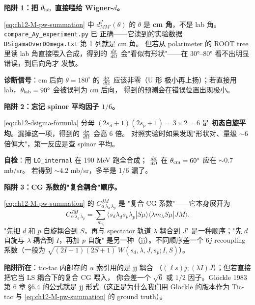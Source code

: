 \begin{pitfallbox}
\textbf{陷阱 1：把 \(\theta_{\rm lab}\) 直接喂给 Wigner-\(d\)。}

\cref{eq:ch12-M-pw-summation} 中 \(d^J_{MM'}(\theta)\) 的 \(\theta\) 是
\textbf{cm 角}，不是 lab 角。\texttt{compare\_Ay\_experiment.py} 已
正确——它读到的实验数据 \texttt{DSigamaOverDOmega.txt} 第 1 列就是 cm 角。
但若从 polarimeter 的 ROOT tree 里读 lab 角直接喂入合成，得到的
\(\frac{d\sigma}{d\Omega}\) 会"看似有形状"——在 30°--80° 看不出明显错误，到后向角才
发散。

\textbf{诊断信号}：cm 后向 \(\theta = 180^\circ\) 的 \(\frac{d\sigma}{d\Omega}\) 应该非零（U 形
极小再上扬）；若直接用 lab，\(\theta_{\rm lab} = 90^\circ\) 会被误判为 cm 后向，
得到的预测会在错误位置出现极小。
\end{pitfallbox}

\begin{pitfallbox}
\textbf{陷阱 2：忘记 spinor 平均因子 \(1/6\)。}

\cref{eq:ch12-dsigma-formula} 分母 \((2 s_d + 1)(2 s_p + 1) = 3 \times 2 = 6\) 是
\textbf{初态自旋平均}。漏掉这一项，得到的 \(\frac{d\sigma}{d\Omega}\) 会高 6 倍。
对照实验时如果发现"形状对、量级 \(\sim 6\) 倍偏大"，第一反应是查 spinor
平均。

\textbf{自检}：用 \texttt{LO\_internal} 在 190 MeV 跑全合成；
\(\frac{d\sigma}{d\Omega}\) 在 \(\theta_{\rm cm} = 60^\circ\) 应在 \(\sim 0.7\) mb/sr。
若得到 \(\sim 4.2\) mb/sr，多半是 1/6 漏了。
\end{pitfallbox}

\begin{pitfallbox}
\textbf{陷阱 3：CG 系数的"复合耦合"顺序。}

\cref{eq:ch12-M-pw-summation} 的 \(C^{JM}_{\alpha\,\lambda_d\,\lambda_p}\) 是
"复合 CG 系数"——它本身展开为
\begin{equation*}
C^{JM}_{\alpha\,\lambda_d\,\lambda_p}
= \sum_{m_\lambda} \langle s_d \lambda_d s_p \lambda_p | S \mu \rangle
  \langle \lambda m_\lambda S \mu | J M \rangle.
\end{equation*}
"先把 \(d\) 和 \(p\) 自旋耦合到 \(S\)，再与 spectator 轨道 \(\lambda\) 耦合到 \(J\)"
是一种顺序；"先 \(d\) 自旋与 \(\lambda\) 耦合到 \(I\)，再加 \(p\) 自旋"
是另一种（jj）。不同顺序差一个 6\(j\) recoupling 系数（一般为
\(\sqrt{(2I+1)(2S+1)}\,W(s_d, \lambda, J, s_p; I, S)\)）。

\textbf{陷阱所在}：tic-tac 内部存的 \(\alpha\) 索引用的是 jj 耦合
（\((\ell s) j; (\lambda I) J\)）；但若直接把它当 LS 耦合下的复合 CG 喂入，
你会差一个 \(\sqrt{6}\) 或 \(1/2\) 因子。Glöckle 1983 第 6 章 §6.4
的公式就是 jj 形式（这正是为什么我们用 Glöckle 的版本作为 Tic-tac 与
\cref{eq:ch12-M-pw-summation} 的 ground truth）。
\end{pitfallbox}

